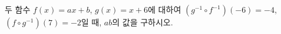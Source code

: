 두 함수 $f(x)=ax+b$, $g(x)=x+6$에 대하여 $(g^{-1}\circ f^{-1})(-6)=-4$, $(f\circ g^{-1})(7)=-2$일 때, $ab$의 값을 구하시오. 
